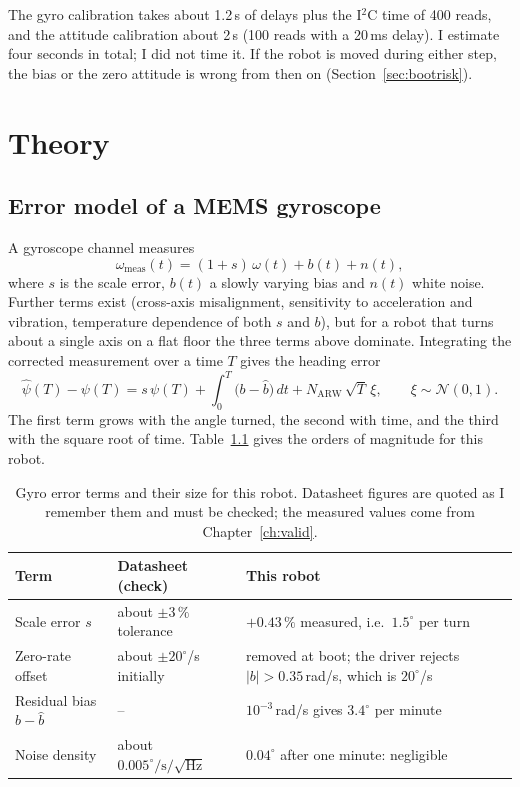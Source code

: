 \documentclass[11pt,a4paper]{report}
\begin{document}
The gyro calibration takes about 1.2\,s of delays plus the I$^2$C time of 400 reads, and the attitude calibration about 2\,s (100 reads with a 20\,ms delay). I estimate four seconds in total; I did not time it. If the robot is moved during either step, the bias or the zero attitude is wrong from then on (Section~\ref{sec:bootrisk}).

\chapter{Theory}

\section{Error model of a MEMS gyroscope}
A gyroscope channel measures
\begin{equation}
  \omega_{\mathrm{meas}}(t)=(1+s)\,\omega(t)+b(t)+n(t), \label{eq:gyromodel}
\end{equation}
where $s$ is the scale error, $b(t)$ a slowly varying bias and $n(t)$ white noise. Further terms exist (cross-axis misalignment, sensitivity to acceleration and vibration, temperature dependence of both $s$ and $b$), but for a robot that turns about a single axis on a flat floor the three terms above dominate. Integrating the corrected measurement over a time $T$ gives the heading error
\begin{equation}
  \hat\psi(T)-\psi(T)=s\,\psi(T)+\int_0^T\bigl(b-\hat b\bigr)\,dt+N_{\mathrm{ARW}}\,\sqrt T\,\xi,\qquad \xi\sim\mathcal N(0,1). \label{eq:yawerr}
\end{equation}
The first term grows with the angle turned, the second with time, and the third with the square root of time. Table~\ref{tab:gyroerr} gives the orders of magnitude for this robot.

\begin{table}[H]
\centering
\caption{Gyro error terms and their size for this robot. Datasheet figures are quoted as I remember them and must be checked; the measured values come from Chapter~\ref{ch:valid}.}\label{tab:gyroerr}
\small
\begin{tabular}{@{}p{3.2cm}p{4.6cm}p{6.2cm}@{}}
\toprule
Term & Datasheet (check) & This robot\\
\midrule
Scale error $s$ & about $\pm3\,\%$ tolerance & $+0.43\,\%$ measured, i.e.\ $1.5^\circ$ per turn\\
Zero-rate offset & about $\pm20^\circ$/s initially & removed at boot; the driver rejects $|b|>0.35$\,rad/s, which is $20^\circ$/s\\
Residual bias $b-\hat b$ & -- & $10^{-3}$\,rad/s gives $3.4^\circ$ per minute\\
Noise density & about $0.005^\circ/\mathrm s/\sqrt{\mathrm{Hz}}$ & $0.04^\circ$ after one minute: negligible\\
\bottomrule
\end{tabular}
\end{table}
\end{document}
